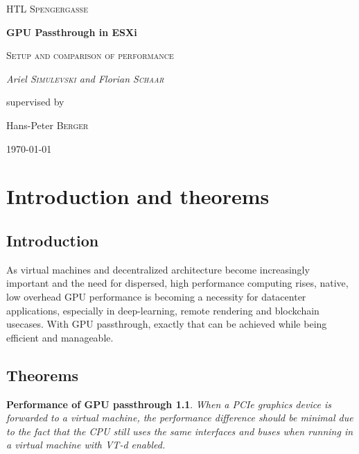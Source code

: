 \documentclass[12pt,a4paper]{report}
\newtheorem*{theorem1}{Performance of GPU passthrough}
\begin{document}
\begin{titlepage}
	\centering
	{\scshape\LARGE HTL Spengergasse \par}
	\vspace{1cm}
	{\huge\bfseries GPU Passthrough in ESXi \par}
	\vspace{1.5cm}
	{\scshape\Large Setup and comparison of performance \par}
	\vspace{2cm}
	{\Large\itshape Ariel \textsc{Simulevski} and Florian \textsc{Schaar}\par}
	\vfill
	supervised by\par
	Hans-Peter \textsc{Berger}

	\vfill

	{\large \today\par}
\end{titlepage}

\newpage

\tableofcontents

\newpage

\chapter{Introduction and theorems}

\section{Introduction}

As virtual machines and decentralized architecture become increasingly important and the need for dispersed, high performance computing rises, native, low overhead GPU performance is becoming a necessity for datacenter applications, especially in deep-learning, remote rendering and blockchain usecases. With GPU passthrough, exactly that can be achieved while being efficient and manageable.

\section{Theorems}

\begin{theorem1}
When a PCIe graphics device is forwarded to a virtual machine, the performance difference should be minimal due to the fact that the CPU still uses the same interfaces and buses when running in a virtual machine with VT-d enabled.
\end{theorem1}
\end{document}
